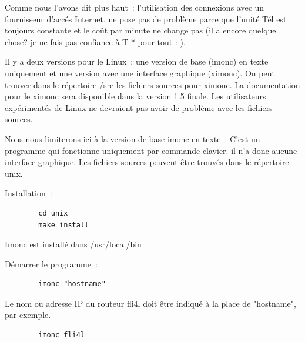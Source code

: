   Comme nous l'avons dit plus haut~: l'utilisation des connexions avec
  un fournisseur d'accés Internet, ne pose pas de problème parce que
  l'unité Tél est toujours constante et le coût par minute ne change pas
  (il a encore quelque chose? je ne fais pas confiance à T-* pour tout :-).


  


  Il y a deux versions pour le Linux~: une version de base (imonc)
  en texte uniquement et une version avec une interface graphique
  (ximonc). On peut trouver dans le répertoire /src les fichiers
  sources pour ximonc. La documentation pour le ximonc sera disponible
  dans la version 1.5 finale. Les utilisateurs expérimentés de Linux  ne
  devraient pas avoir de problème avec les fichiers sources.

  Nous nous limiterons ici à la version de base imonc en texte~: C'est
  un programme qui fonctionne uniquement par commande clavier. il n'a
  donc aucune interface graphique. Les fichiers sources peuvent être
  trouvés dans le répertoire unix.

  Installation~:

\begin{example}
\begin{verbatim}
        cd unix
        make install
\end{verbatim}
\end{example}

  Imonc est installé dans /usr/local/bin

  Démarrer le programme~:

\begin{example}
\begin{verbatim}
        imonc "hostname"
\end{verbatim}
\end{example}

  Le nom ou adresse IP du routeur fli4l doit être indiqué à la place
  de "hostname", par exemple.

\begin{example}
\begin{verbatim}
        imonc fli4l
\end{verbatim}
\end{example}

